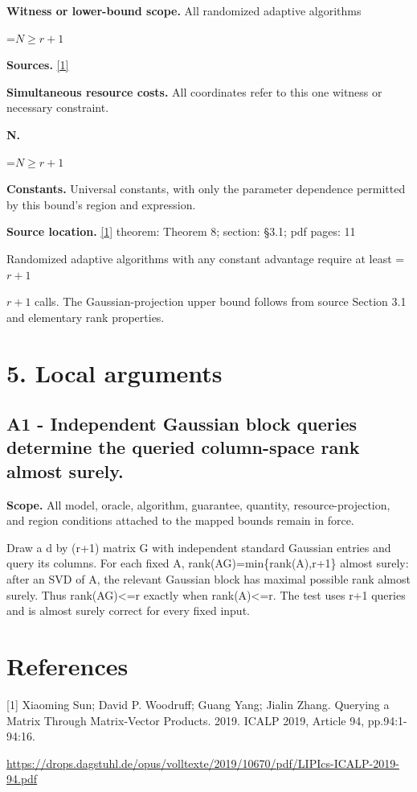 \documentclass[10pt,a4paper]{article}
\newcommand{\AtlasMath}[1]{\par\begingroup\centering\setbox0=\hbox{$\displaystyle #1$}\ifdim\wd0>1.4\linewidth\typeout{ATLAS WIDE FORMULA: \the\wd0}\fi\ifdim\wd0>\linewidth\resizebox{\linewidth}{!}{\box0}\else\box0\fi\par\endgroup}
\newcommand{\AtlasInlineMath}[1]{\begingroup\setbox0=\hbox{$#1$}\ifdim\wd0>.4\linewidth\endgroup\AtlasMath{#1}\else\endgroup$#1$\fi}
\begin{document}
\textbf{Witness or lower-bound scope.} All randomized adaptive algorithms

\AtlasMath{N\ge r+1}
\textbf{Sources.} \href{https://drops.dagstuhl.de/opus/volltexte/2019/10670/pdf/LIPIcs-ICALP-2019-94.pdf}{[1]}

\textbf{Simultaneous resource costs.} All coordinates refer to this one witness or necessary constraint.

\textbf{N.}

\AtlasMath{N\ge r+1}
\textbf{Constants.} Universal constants, with only the parameter dependence permitted by this bound’s region and expression.

\textbf{Source location.} \href{https://drops.dagstuhl.de/opus/volltexte/2019/10670/pdf/LIPIcs-ICALP-2019-94.pdf}{[1]} theorem: Theorem 8; section: §3.1; pdf pages: 11

Randomized adaptive algorithms with any constant advantage require at least \AtlasInlineMath{r+1} calls. The Gaussian-projection upper bound follows from source Section 3.1 and elementary rank properties.

\section{5. Local arguments}
\subsection{A1 - Independent Gaussian block queries determine the queried column-space rank almost surely.}
\textbf{Scope.} All model, oracle, algorithm, guarantee, quantity, resource-projection, and region conditions attached to the mapped bounds remain in force.

Draw a d by (r+1) matrix G with independent standard Gaussian entries and query its columns. For each fixed A, rank(AG)=min\{rank(A),r+1\} almost surely: after an SVD of A, the relevant Gaussian block has maximal possible rank almost surely. Thus rank(AG)<=r exactly when rank(A)<=r. The test uses r+1 queries and is almost surely correct for every fixed input.

\section{References}
[1] Xiaoming Sun; David P. Woodruff; Guang Yang; Jialin Zhang. Querying a Matrix Through Matrix-Vector Products. 2019. ICALP 2019, Article 94, pp.94:1-94:16.

\url{https://drops.dagstuhl.de/opus/volltexte/2019/10670/pdf/LIPIcs-ICALP-2019-94.pdf}
\end{document}
